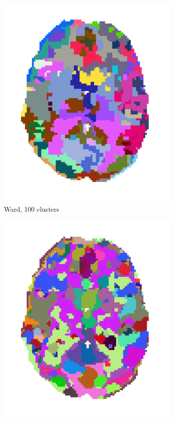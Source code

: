 \documentclass{article} %
\begin{document}
\begin{figure}
\begin{preview}
\begin{subfigure}[b]{.26\linewidth}
        \includegraphics[width=\linewidth]{ward_100}%
	\vspace*{-1.6em}
        \caption{\footnotesize\sffamily\hspace*{-.9ex}Ward, 100 clusters}
      \end{subfigure}%
      \begin{subfigure}[b]{.26\linewidth}
        \includegraphics[width=\linewidth]{kmeans_1000}%

\end{subfigure}
\end{preview}
\end{figure}
\end{document}
